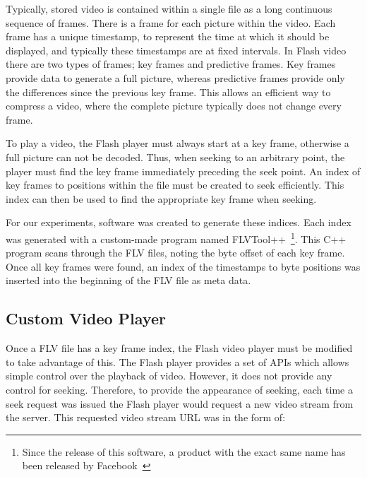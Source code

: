     Typically, stored video is contained within a single file as a long continuous sequence of frames. There is a frame for each picture within the video. Each frame has a unique timestamp, to represent the time at which it should be displayed, and typically these timestamps are at fixed intervals. In Flash video there are two types of frames; key frames and predictive frames. Key frames provide data to generate a full picture, whereas predictive frames provide only the differences since the previous key frame. This allows an efficient way to compress a video, where the complete picture typically does not change every frame.

    To play a video, the Flash player must always start at a key frame, otherwise a full picture can not be decoded. Thus, when seeking to an arbitrary point, the player must find the key frame immediately preceding the seek point. An index of key frames to positions within the file must be created to seek efficiently. This index can then be used to find the appropriate key frame when seeking.

    For our experiments, software was created to generate these indices. Each index was generated with a custom-made program named FLVTool++~\footnote{Since the release of this software, a product with the exact same name has been released by Facebook~\cite{flvtool}}. This C++ program scans through the FLV files, noting the byte offset of each key frame. Once all key frames were found, an index of the timestamps to byte positions was inserted into the beginning of the FLV file as meta data.

\subsection{Custom Video Player}

    Once a FLV file has a key frame index, the Flash video player must be modified to take advantage of this. The Flash player provides a set of APIs which allows simple control over the playback of video. However, it does not provide any control for seeking. Therefore, to provide the appearance of seeking, each time a seek request was issued the Flash player would request a new video stream from the server. This requested video stream URL was in the form of:

